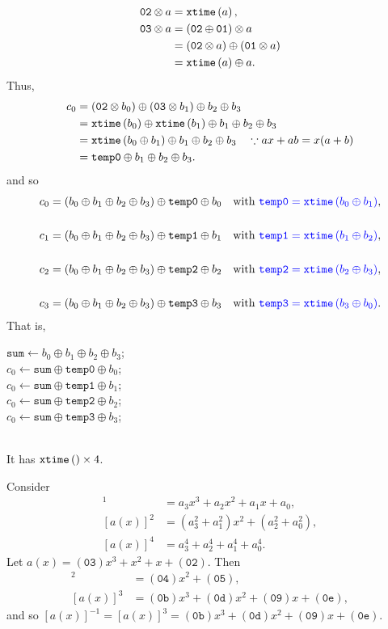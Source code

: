 \begin{align*}
	\texttt{02}\otimes a&=\texttt{xtime}\left(a\right), \\
	\texttt{03}\otimes a&=(\texttt{02}\oplus \texttt{01})\otimes a\\
	&=(\texttt{02}\otimes a)\oplus(\texttt{01}\otimes a) \\
	&=\texttt{xtime}\left(a\right)\oplus a.
\end{align*} Thus, \begin{align*}
c_0&=(\texttt{02}\otimes b_0)\oplus(\texttt{03}\otimes b_1)\oplus b_2\oplus b_3\\
&=\texttt{xtime}\left(b_0\right)\oplus\texttt{xtime}\left(b_1\right)\oplus b_1\oplus b_2\oplus b_3 \\
&=\texttt{xtime}\left(b_0\oplus b_1\right)\oplus b_1\oplus b_2\oplus b_3\quad\because ax+ab=x(a+b) \\
&=\texttt{temp0}\oplus b_1\oplus b_2\oplus b_3.
\end{align*} and so \begin{align*}
c_0&=(b_0\oplus b_1\oplus b_2\oplus b_3)\oplus\texttt{temp0}\oplus b_0 &\text{with}\ \textcolor{blue}{\texttt{temp0} = \texttt{xtime}\left(b_0\oplus b_1\right)},\\ \\
c_1&=(b_0\oplus b_1\oplus b_2\oplus b_3)\oplus\texttt{temp1}\oplus b_1 &\text{with}\ \textcolor{blue}{\texttt{temp1} = \texttt{xtime}\left(b_1\oplus b_2\right)},\\ \\
c_2&=(b_0\oplus b_1\oplus b_2\oplus b_3)\oplus\texttt{temp2}\oplus b_2 &\text{with}\ \textcolor{blue}{\texttt{temp2} = \texttt{xtime}\left(b_2\oplus b_3\right)},\\ \\
c_3&=(b_0\oplus b_1\oplus b_2\oplus b_3)\oplus\texttt{temp3}\oplus b_3 &\text{with}\ \textcolor{blue}{\texttt{temp3} = \texttt{xtime}\left(b_3\oplus b_0\right)}.
\end{align*} That is, \begin{algorithm}
$\texttt{sum}\gets b_0\oplus b_1\oplus b_2\oplus b_3$; \\
$c_0\gets\texttt{sum}\oplus\texttt{temp0}\oplus b_0$; \\
$c_0\gets\texttt{sum}\oplus\texttt{temp1}\oplus b_1$; \\
$c_0\gets\texttt{sum}\oplus\texttt{temp2}\oplus b_2$; \\
$c_0\gets\texttt{sum}\oplus\texttt{temp3}\oplus b_3$; \\
\end{algorithm}\\ It has $\texttt{xtime}\left(\right)\times 4$.

\newpage
Consider \begin{align*}
	[a(x)]^1&=a_3x^3+a_2x^2+a_1x+a_0,\\
	[a(x)]^2&=(a_3^2+a_1^2)x^2+(a_2^2+a_0^2),\\
	[a(x)]^4&=a_3^4+a_2^4+a_1^4+a_0^4.
\end{align*}
Let $a(x)=(\texttt{03})x^3+x^2+x+(\texttt{02})$. Then \begin{align*}
	[a(x)]^2&=(\texttt{04})x^2+(\texttt{05}),\\
	[a(x)]^3&=(\texttt{0b})x^3+(\texttt{0d})x^2+(\texttt{09})x+(\texttt{0e}),
\end{align*} and so $[a(x)]^{-1}=[a(x)]^3=(\texttt{0b})x^3+(\texttt{0d})x^2+(\texttt{09})x+(\texttt{0e})$.


